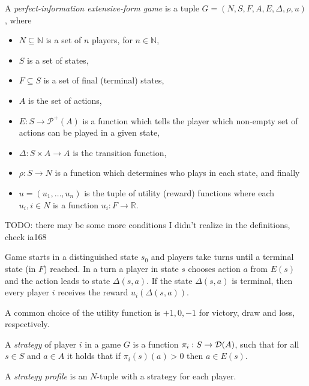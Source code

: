 \begin{definition}
    A {\em perfect-information extensive-form game}
    is a tuple $G = (N, S, F, A, E, \Delta, \rho, u)$,
    where
    \begin{itemize}
        \item $N \subseteq \mathbb{N}$ is a set of $n$ players,
            for $n \in \mathbb{N}$,
        \item $S$ is a set of states,
        \item $F \subseteq S$ is a set of final (terminal) states,
        \item $A$ is the set of actions,
        \item $E : S \to \mathcal{P}^+(A)$ is a function which tells the player
            which non-empty set of actions can be played in a given state,
        \item $\Delta : S \times A \to A$ is the transition function,
        \item $\rho : S \to N$ is a function which determines who plays in each state,
            and finally
        \item $u = (u_1,\ldots,u_{n})$ is the tuple of
            utility (reward) functions where each $u_i, i \in N$ is a function
            $u_i : F \to \mathbb{R}$.
    \end{itemize}
\end{definition}

TODO: there may be some more conditions I didn't realize in the definitions, check
ia168

Game starts in a distinguished state $s_0$ and players take turns until
a terminal state (in $F$) reached. In a turn a player in state $s$ chooses
action $a$ from $E(s)$ and the action leads to state $\Delta(s,a)$.
If the state $\Delta(s,a)$ is terminal, then every player $i$ receives
the reward $u_i(\Delta(s,a))$.

A common choice of the utility function is $+1, 0, -1$ for victory, draw
and loss, respectively.

\begin{example}
\end{example}

\begin{definition}
    A {\em strategy} of player $i$ in a game $G$ is a function
    $\pi_i : S \to \mathcal{D}(A)$, such that for all $s \in S$ and $a
    \in A$ it holds that if $\pi_i(s)(a) > 0$ then $a \in E(s)$.

    A {\em strategy profile} is an $N$-tuple with a strategy for each player.
\end{definition}

